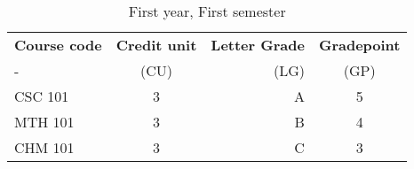 \documentclass{article}
\begin{document}
	
	\begin{table}[h!]
		\begin{center}
			\caption{First year, First semester}
			\label{tab:table1}
			\begin{tabular}{l|c|r|c}
\textbf{Course code} & \textbf{Credit unit}&
\textbf{Letter Grade} & \textbf{Gradepoint}\\
- & (CU) & (LG) & (GP) \\
\hline
CSC 101 & 3 & A & 5\\
MTH 101 & 3 & B & 4\\
CHM 101 & 3 & C & 3\\
\end{tabular}
\end{center}
\end{table}
\end{document}
